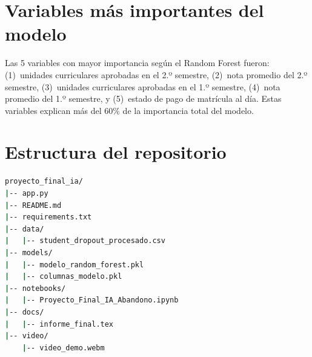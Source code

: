 \documentclass[10pt,twocolumn]{article}
\begin{document}
\appendix

\section{Variables más importantes del modelo}

Las 5 variables con mayor importancia según el Random Forest fueron:
(1)~unidades curriculares aprobadas en el 2.º semestre,
(2)~nota promedio del 2.º semestre,
(3)~unidades curriculares aprobadas en el 1.º semestre,
(4)~nota promedio del 1.º semestre, y
(5)~estado de pago de matrícula al día.
Estas variables explican más del 60\% de la importancia total del modelo.

\section{Estructura del repositorio}

\begin{lstlisting}[language=bash,
  caption={Árbol de archivos del proyecto}]
proyecto_final_ia/
|-- app.py
|-- README.md
|-- requirements.txt
|-- data/
|   |-- student_dropout_procesado.csv
|-- models/
|   |-- modelo_random_forest.pkl
|   |-- columnas_modelo.pkl
|-- notebooks/
|   |-- Proyecto_Final_IA_Abandono.ipynb
|-- docs/
|   |-- informe_final.tex
|-- video/
    |-- video_demo.webm
\end{lstlisting}
\end{document}
